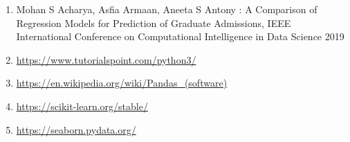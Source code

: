 \documentclass[12pt]{article}
\begin{document}
\begin{sloppypar}
\begin{enumerate}
    \item Mohan S Acharya, Asfia Armaan, Aneeta S Antony : A Comparison of Regression Models for Prediction of Graduate Admissions, IEEE International Conference on Computational Intelligence in Data Science 2019
    \item \url{https://www.tutorialspoint.com/python3/}
    \item \url{https://en.wikipedia.org/wiki/Pandas_(software)}
    \item \url{https://scikit-learn.org/stable/}
    \item \url{https://seaborn.pydata.org/}
\end{enumerate}



\end{sloppypar}
\end{document}
